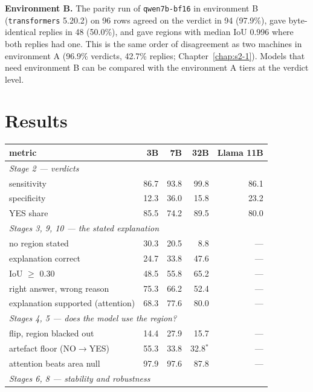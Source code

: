 \textbf{Environment B.} The parity run of \texttt{qwen7b-bf16} in environment B (\texttt{transformers}
5.20.2) on 96 rows agreed on the verdict in 94 (97.9\%), gave byte-identical replies in 48 (50.0\%), and
gave regions with median IoU 0.996 where both replies had one. This is the same order of disagreement as
two machines in environment A (96.9\% verdicts, 42.7\% replies; Chapter~\ref{chap:s2-1}). Models that
need environment B can be compared with the environment A tiers at the verdict level.

\section{Results}

\begin{table}[tbp]
\centering
\small
\begin{tabular}{lrrrr}
\toprule
\textbf{metric} & \textbf{3B} & \textbf{7B} & \textbf{32B} & \textbf{Llama 11B} \\
\midrule
\multicolumn{5}{l}{\emph{Stage 2 --- verdicts}} \\
sensitivity                         & 86.7 & 93.8 & 99.8 & 86.1 \\
specificity                         & 12.3 & 36.0 & 15.8 & 23.2 \\
YES share                           & 85.5 & 74.2 & 89.5 & 80.0 \\
\multicolumn{5}{l}{\emph{Stages 3, 9, 10 --- the stated explanation}} \\
no region stated                    & 30.3 & 20.5 & 8.8 & --- \\
explanation correct                 & 24.7 & 33.8 & 47.6 & --- \\
\quad IoU $\geq$ 0.30               & 48.5 & 55.8 & 65.2 & --- \\
\quad right answer, wrong reason    & 75.3 & 66.2 & 52.4 & --- \\
explanation supported (attention)   & 68.3 & 77.6 & 80.0 & --- \\
\multicolumn{5}{l}{\emph{Stages 4, 5 --- does the model use the region?}} \\
flip, region blacked out            & 14.4 & 27.9 & 15.7 & --- \\
\quad artefact floor (NO$\to$YES)   & 55.3 & 33.8 & 32.8$^{*}$ & --- \\
attention beats area null           & 97.9 & 97.6 & 87.8 & --- \\
\multicolumn{5}{l}{\emph{Stages 6, 8 --- stability and robustness}} \\

\end{tabular}
\end{table}
